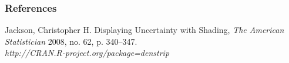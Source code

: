 \documentclass[11pt,usenames,dvipsnames,svgnames,x11names]{beamer}
\theoremstyle{plain}
\theoremstyle{definition}
\theoremstyle{remark}
\begin{document}
\begin{frame}
	\frametitle{References}
	\begin{thebibliography}{9}
		\bibitem{} Jackson, Christopher H. Displaying Uncertainty with Shading, \emph{The American Statistician} 2008, no. 62, p. 340--347.\\
		\bibitem{} \emph{http://CRAN.R-project.org/package=denstrip}
	\end{thebibliography}
\end{frame}
\end{document}
